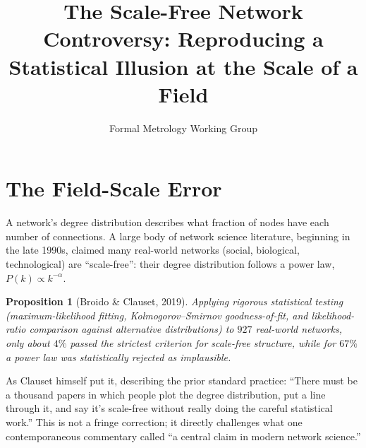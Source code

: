 \documentclass[10pt,journal,compsoc]{IEEEtran}
\newtheorem{proposition}{Proposition}
\begin{document}
\title{The Scale-Free Network Controversy: Reproducing a Statistical Illusion at the Scale of a Field}
\author{Formal Metrology Working Group}


\maketitle

\section{The Field-Scale Error}
A network's degree distribution describes what fraction of nodes have each number of connections. A large body of network science literature, beginning in the late 1990s, claimed many real-world networks (social, biological, technological) are ``scale-free'': their degree distribution follows a power law, $P(k)\propto k^{-\alpha}$.

\begin{proposition}[Broido \& Clauset, 2019]
Applying rigorous statistical testing (maximum-likelihood fitting, Kolmogorov--Smirnov goodness-of-fit, and likelihood-ratio comparison against alternative distributions) to $927$ real-world networks, only about $4\%$ passed the strictest criterion for scale-free structure, while for $67\%$ a power law was statistically rejected as implausible.
\end{proposition}
As Clauset himself put it, describing the prior standard practice: ``There must be a thousand papers in which people plot the degree distribution, put a line through it, and say it's scale-free without really doing the careful statistical work.'' This is not a fringe correction; it directly challenges what one contemporaneous commentary called ``a central claim in modern network science.''
\end{document}

